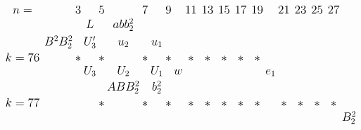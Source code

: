 \documentclass{article}
\begin{document}
\(
\begin{tikzcd}[
nodes={font=\Large,inner sep=0pt},
row sep=0.2cm,
column sep=0.1cm
]
n= && & 3 & & 5 & & 7 & & 9 & & 11 & & 13 & & 15 & & 17 && 19 && 21 && 23 && 25 && 27 \\
&& && L && abb_2^2 && && && &&  \\
&& B^2B_2^2 && U'_3 && u_2 && u_1 \\
k=76 &&& * && * && * && * && * && * && * && * && * && && \\
&& && U_3 && U_2 && U_1 && w && && && && && e_1 \\
&& && && ABB_2^2 && b_2^2 && &&  \\
k=77 &&& && * && * && * && * && * && * && * && * && * && * && * && * && \\
&& && && && && && && && && && && && && && B_2^2 \\
\\
\end{tikzcd}
\)
\end{document}
